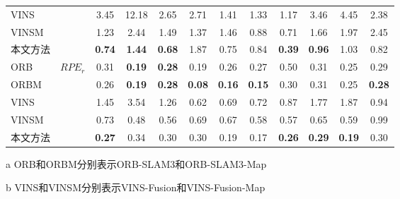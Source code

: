 \begin{table}
\begin{threeparttable}
\begin{tabular}{lccccccccccc}
VINS  &                       & 3.45          & 12.18         & 2.65          & 2.71          & 1.41          & 1.33          & 1.17          & 3.46          & 4.45          & 2.38          \\
VINSM &                       & 1.23          & 2.44          & 1.49          & 1.37          & 1.46          & 0.88          & 0.71          & 1.66          & 1.97          & 2.45          \\
本文方法    &                       & \cellcolor[HTML]{FFCCC9}\textbf{0.74} & \cellcolor[HTML]{FFCCC9}\textbf{1.44} & \cellcolor[HTML]{FFCCC9}\textbf{0.68} & 1.87          & 0.75          & 0.84          & \cellcolor[HTML]{FFCCC9}\textbf{0.39} & \cellcolor[HTML]{FFCCC9}\textbf{0.96} & 1.03          & 0.82          \\ \midrule
ORB   & \multirow{5}{*}{$RPE_r$\textdownarrow{}} & 0.31          & \cellcolor[HTML]{FFCCC9}\textbf{0.19} & \cellcolor[HTML]{FFCCC9}\textbf{0.28} & 0.19          & 0.26          & 0.27          & 0.50          & 0.31          & 0.25          & 0.29          \\
ORBM  &                       & 0.26          & \cellcolor[HTML]{FFCCC9}\textbf{0.19} & \cellcolor[HTML]{FFCCC9}\textbf{0.28} & \cellcolor[HTML]{FFCCC9}\textbf{0.08} & \cellcolor[HTML]{FFCCC9}\textbf{0.16} & \cellcolor[HTML]{FFCCC9}\textbf{0.15} & 0.30          & 0.31          & 0.25          & \cellcolor[HTML]{FFCCC9}\textbf{0.28} \\
VINS  &                       & 1.45          & 3.54          & 1.26          & 0.62          & 0.69          & 0.72          & 0.87          & 1.77          & 1.87          & 0.94          \\
VINSM &                       & 0.73          & 0.48          & 0.56          & 0.69          & 0.67          & 0.58          & 0.57          & 0.65          & 0.59          & 0.99          \\
本文方法    &                       & \cellcolor[HTML]{FFCCC9}\textbf{0.27} & 0.34          & 0.30          & 0.30          & 0.19          & 0.17          & \cellcolor[HTML]{FFCCC9}\textbf{0.26} & \cellcolor[HTML]{FFCCC9}\textbf{0.29} & \cellcolor[HTML]{FFCCC9}\textbf{0.19} & 0.30          \\ \bottomrule
\end{tabular}
\label{tab:loc_kitti}
\begin{tablenotes}
  \item [a] ORB和ORBM分别表示ORB-SLAM3和ORB-SLAM3-Map
  \item [b] VINS和VINSM分别表示VINS-Fusion和VINS-Fusion-Map
\end{tablenotes}
\end{threeparttable}
\end{table}

